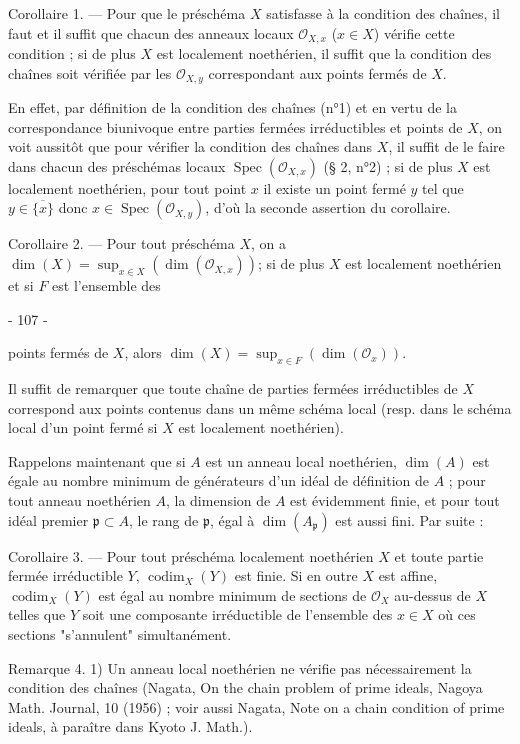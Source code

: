 Corollaire 1. — Pour que le préschéma $X$ satisfasse à la condition des chaînes, il faut et il suffit que chacun des anneaux locaux $\mathcal{O}_{X,x}$ ($x \in X$) vérifie cette condition ; si de plus $X$ est localement noethérien, il suffit que la condition des chaînes soit vérifiée par les $\mathcal{O}_{X,y}$ correspondant aux points fermés de $X$.

En effet, par définition de la condition des chaînes (n°1) et en vertu de la correspondance biunivoque entre parties fermées irréductibles et points de $X$, on voit aussitôt que pour vérifier la condition des chaînes dans $X$, il suffit de le faire dans chacun des préschémas locaux $\operatorname{Spec}(\mathcal{O}_{X,x})$ (§ 2, n°2) ; si de plus $X$ est localement noethérien, pour tout point $x$ il existe un point fermé $y$ tel que $y \in \overline{\{x\}}$ donc $x \in \operatorname{Spec}(\mathcal{O}_{X,y})$, d'où la seconde assertion du corollaire.

Corollaire 2. — Pour tout préschéma $X$, on a $\dim(X) = \sup_{x \in X}(\dim(\mathcal{O}_{X,x}))$; si de plus $X$ est localement noethérien et si $F$ est l'ensemble des

\newpage


- 107 -

points fermés de $X$, alors $\dim(X) = \sup_{x \in F} (\dim(\mathcal{O}_x))$.

Il suffit de remarquer que toute chaîne de parties fermées irréductibles de $X$ correspond aux points contenus dans un même schéma local (resp. dans le schéma local d'un point fermé si $X$ est localement noethérien).

Rappelons maintenant que si $A$ est un anneau local noethérien, $\dim(A)$ est égale au nombre minimum de générateurs d'un idéal de définition de $A$ ; pour tout anneau noethérien $A$, la dimension de $A$ est évidemment finie, et pour tout idéal premier $\mathfrak{p} \subset A$, le rang de $\mathfrak{p}$, égal à $\dim(A_{\mathfrak{p}})$ est aussi fini. Par suite :

Corollaire 3. — Pour tout préschéma localement noethérien $X$ et toute partie fermée irréductible $Y$, $\operatorname{codim}_X(Y)$ est finie. Si en outre $X$ est affine, $\operatorname{codim}_X(Y)$ est égal au nombre minimum de sections de $\mathcal{O}_X$ au-dessus de $X$ telles que $Y$ soit une composante irréductible de l'ensemble des $x \in X$ où ces sections "s'annulent" simultanément.

Remarque 4. 1) Un anneau local noethérien ne vérifie pas nécessairement la condition des chaînes (Nagata, On the chain problem of prime ideals, Nagoya Math. Journal, 10 (1956) ; voir aussi Nagata, Note on a chain condition of prime ideals, à paraître dans Kyoto J. Math.).

